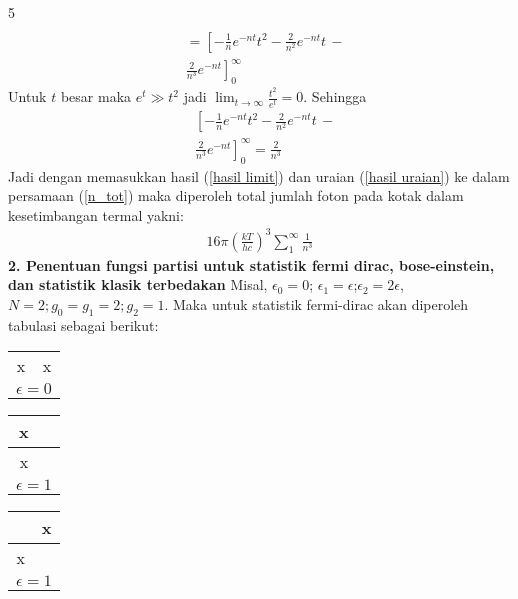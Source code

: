 \documentclass[a4paper  , 6 pt]{article}
\begin{document}
\begin{tiny}
\begin{multicols} {5}
\begin{align}
\nonumber 
\\
& =  \left [ -  \frac{1}{n} e^{-n t} t^2 - \frac{2}{n^2} e^{-nt} t\, - \right.
 \nonumber \\
& \left. \frac{2}{n^3} e^{-nt}  \right]_0^\infty 
\end{align}
Untuk $t$ besar maka $e^t \gg t^2$ jadi $\displaystyle \lim_{t \rightarrow \infty} \frac{t^2}{e^t} = 0$. Sehingga 
\begin{align}
& \left [- \frac{1}{n} e^{-n t} t^2 - \frac{2}{n^2} e^{-nt} t\,  - \right. \nonumber \\
& \left.  \frac{2}{n^3} e^{-nt}  \right]_0^\infty = \frac{2}{n^3} \label{hasil limit}
\end{align}
Jadi dengan memasukkan hasil (\ref{hasil limit}) dan uraian (\ref{hasil uraian}) ke dalam persamaan (\ref{n_tot}) maka diperoleh total jumlah foton pada kotak dalam kesetimbangan termal  yakni:
\begin{align}
\boxed{16 \pi \left(\frac{kT}{hc}\right)^3 \sum_1^\infty \frac{1}{n^3}}
\end{align}
\textbf{2. Penentuan fungsi partisi untuk statistik fermi dirac, bose-einstein, dan statistik klasik terbedakan}
\newline
Misal, $\epsilon _0 = 0 $; $\epsilon_1 = \epsilon $;$ \epsilon_2 = 2 \epsilon$, $N = 2; g_0 = g_1 = 2; g_2 = 1 $. Maka untuk statistik fermi-dirac akan diperoleh tabulasi sebagai berikut: \newline
\begin{tabular}{|c | c| }
 \cline{1-1} \\ \hline
 &  \\ \hline 
x & x  \\
\hline
\multicolumn{2}{|c|}{$\epsilon = 0$} \\ \hline
\end{tabular}
\begin{tabular}{|c | c| }
 \cline{1-1}  \\ \hline
x &  \\ \hline 
x &   \\
\hline
\multicolumn{2}{|c|}{$\epsilon = 1$} \\ \hline
\end{tabular}
\begin{tabular}{|c | c| }
 \cline{1-1}  \\ \hline
 & x \\ \hline 
x &   \\
\hline
\multicolumn{2}{|c|}{$\epsilon = 1$} \\ \hline
\end{tabular}

\end{multicols}
\end{tiny}
\end{document}
